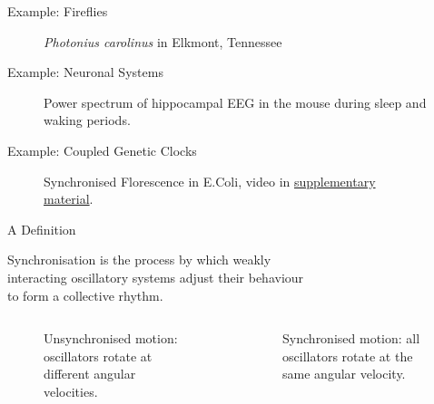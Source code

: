 \documentclass[10pt,reqno]{beamer}
\begin{document}
\begin{frame}{Example: Fireflies\cite{Yiu2017}}
\begin{figure}
\caption{\emph{Photonius carolinus} in Elkmont, Tennessee}
\end{figure}
\end{frame}
\begin{frame}{Example: Neuronal Systems\cite{Buzsaki:2004aa}}
\begin{figure}
\caption{Power spectrum of hippocampal EEG in the mouse during sleep and waking periods.}
\end{figure}
\end{frame}
\begin{frame}{Example: Coupled Genetic Clocks\cite{Danino:2010aa}}
\begin{figure}
\caption{Synchronised Florescence in E.Coli, video in \href{https://www.nature.com/articles/nature08753}{supplementary material}.}
\end{figure}
\end{frame}
\begin{frame}{A Definition}

\begin{tcolorbox}[notitle, boxrule=0pt, colback=lred]
\centering
	Synchronisation is the process by which weakly\\ interacting oscillatory systems adjust their behaviour\\ to form a collective rhythm.
\end{tcolorbox}
	\begin{columns}
		\scriptsize
	\begin{column}{0.49\textwidth}
		\begin{figure}
			\caption{Unsynchronised motion: oscillators rotate at different angular velocities.}
		\end{figure}
	\end{column}
	\begin{column}{0.49\textwidth}
		\begin{figure}
			\caption{Synchronised motion: all oscillators rotate at the same angular velocity.}
		\end{figure}
	\end{column}
\end{columns}
\end{frame}
\end{document}
